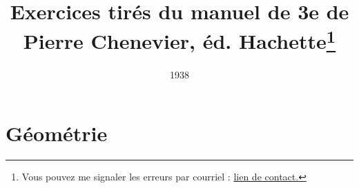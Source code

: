 \documentclass[12 pt]{report}
\author{ }
\title{\Large Exercices tirés du manuel de 3e de Pierre Chenevier, éd. Hachette\footnote{Vous pouvez me signaler les erreurs par courriel : \href{mailto:leturcq.d@orange.fr}{lien de contact.} 
	}
	}
\date{1938}
\theoremstyle{plain}
\newcounter{n}
\begin{document}
	\maketitle 
	
	
%	
% 
% 
% 
% 
% 
% 
% 
% 
% 
% 
% 
% 
% 
% 
% 
%  
% 
% 
% 
% 
\part{Géométrie}
 
 
 
 
 
 
 
 
 
 
 
 
 
 
 
 
 
 	
\end{document}
